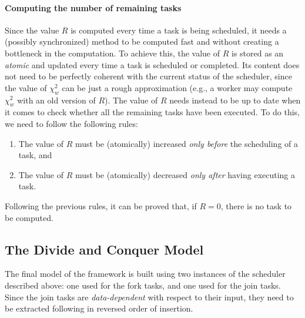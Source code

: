 \documentclass[11pt, a4paper]{article}
\begin{document}
\paragraph{Computing the number of remaining tasks} Since the value $R$ is computed every time a task is being scheduled, it needs a (possibly synchronized) method to be computed fast and without creating a bottleneck in the computation. To achieve this, the value of $R$ is stored as an \emph{atomic} and updated every time a task is scheduled or completed. Its content does not need to be perfectly coherent with the current status of the scheduler, since the value of $\chi^2_w$ can be just a rough approximation (e.g., a worker may compute $\chi^2_w$ with an old version of $R$). The value of $R$ needs instead to be up to date when it comes to check whether all the remaining tasks have been executed. To do this, we need to follow the following rules:
%
\begin{enumerate}
	\item The value of $R$ must be (atomically) increased \emph{only before} the scheduling of a task, and
	\item The value of $R$ must be (atomically) decreased \emph{only after} having executing a task. 
\end{enumerate}
%
Following the previous rules, it can be proved that, if $R = 0$, there is no task to be computed.


\subsection{The Divide and Conquer Model}\label{subsec:dac-model}

The final model of the framework is built using two instances of the scheduler described above: one used for the fork tasks, and one used for the join tasks. Since the join tasks are \emph{data-dependent} with respect to their input, they need to be extracted following in reversed order of insertion.
\end{document}
